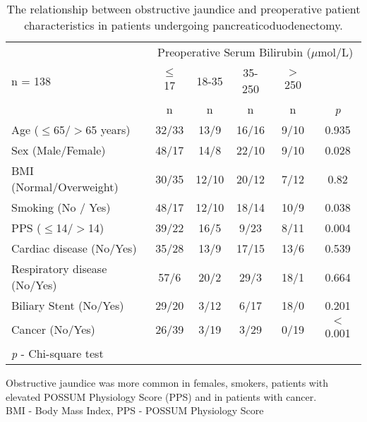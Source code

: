 \begin{sidewaystable}[p]

\caption{The relationship  between obstructive jaundice and preoperative patient characteristics in patients undergoing pancreaticoduodenectomy.}
\label{table:cpet_oj_patient}
\centering\renewcommand{\arraystretch}{1.4} %
\setlength{\tabcolsep}{12pt} %
	\begin{tabular}{| l | c c c c c |}
		\hline
		                             & \multicolumn{5}{c|}{Preoperative Serum Bilirubin ($\mu$mol/L)} \\
		n = 138                      & $\leq$ 17 & 18-35 & 35-250 & $>$ 250 &  \\
		                             & n         & n     & n      & n       & \textit{p}              \\ \hline
		Age ($\leq$65/$>$65 years)   & 32/33     & 13/9  & 16/16  & 9/10    & 0.935                   \\
		Sex (Male/Female)            & 48/17     & 14/8  & 22/10  & 9/10    & 0.028                   \\
		BMI (Normal/Overweight)      & 30/35     & 12/10 & 20/12  & 7/12    & 0.82                    \\
		Smoking (No / Yes)           & 48/17     & 12/10 & 18/14  & 10/9    & 0.038                   \\
		PPS ($\leq$14/$>$14)         & 39/22     & 16/5  & 9/23   & 8/11    & 0.004                   \\
		Cardiac disease (No/Yes)     & 35/28     & 13/9  & 17/15  & 13/6    & 0.539                   \\
		Respiratory disease (No/Yes) & 57/6      & 20/2  & 29/3   & 18/1    & 0.664                   \\
		Biliary Stent (No/Yes)       & 29/20     & 3/12  & 6/17   & 18/0    & 0.201                   \\
		Cancer (No/Yes)              & 26/39     & 3/19  & 3/29   & 0/19    & $<$0.001                \\ \hline
		\multicolumn{6}{l}{\textit{p} - Chi-square test}
	\end{tabular}
	\medskip
	\begin{flushleft}
		Obstructive jaundice was more common in females, smokers, patients with elevated POSSUM Physiology Score (PPS) and in patients with cancer.\\
		BMI - Body Mass Index, PPS - POSSUM Physiology Score
	\end{flushleft}
\end{sidewaystable}
